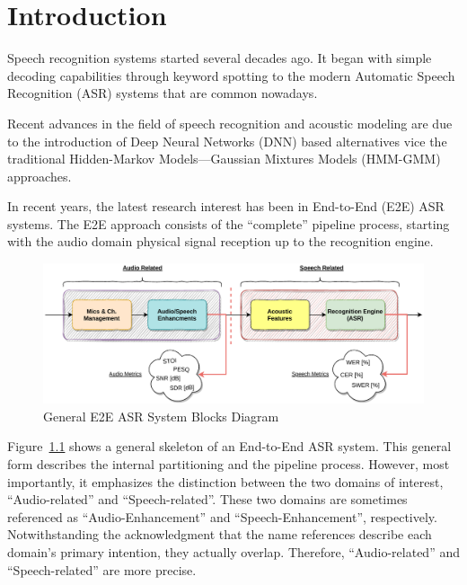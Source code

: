 \chapter{Introduction}

Speech recognition systems
started several decades ago.
It began with simple decoding capabilities through keyword
spotting to the modern Automatic Speech Recognition (ASR) systems
that are common nowadays\cite{asrBriefHistory}.

\bigskip

Recent advances in the field of speech recognition and acoustic modeling are
due to the introduction of 
Deep Neural Networks (DNN) 
based alternatives vice the traditional
Hidden-Markov Models---Gaussian Mixtures Models (HMM-GMM) approaches\cite{7472778, 6296526}.

\bigskip

In recent years, the latest research 
interest has been in 
End-to-End (E2E) ASR systems\cite{boeddeker2018exploring}.
The E2E approach consists of the ``complete'' pipeline process, starting with
the audio domain physical signal reception up to the recognition engine.

\begin{figure}[H]
	\centering
	\includegraphics[width=\linewidth]{Introduction/images/asr_blocks}
	\caption{General E2E ASR System Blocks Diagram}\label{fig:asr_blocks_diagram}
\end{figure}
\vspace{-0.5cm}

Figure~\ref{fig:asr_blocks_diagram} shows 
a general skeleton of
an End-to-End ASR system. This general form describes the
internal partitioning and the pipeline process.
However, most importantly, it emphasizes
the distinction between the two domains of interest,
``Audio-related'' and ``Speech-related''.
These two domains are sometimes referenced
as ``Audio-Enhancement'' and ``Speech-Enhancement'', respectively.
Notwithstanding the acknowledgment that 
the name references describe each domain's 
primary intention, they actually overlap.
Therefore, ``Audio-related'' and ``Speech-related'' are more precise.

